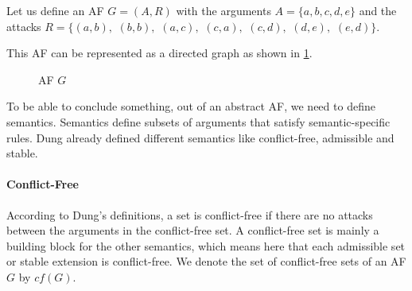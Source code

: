 \begin{example}
    Let us define an AF $G = (A, R)$ with the arguments
    $A=\{a, b, c, d, e\}$ and the attacks
    $R=\bigl\{(a,b),$
    $(b,b),$
    $(a,c),$
    $(c,a),$
    $(c,d),$
    $(d,e),$
    $(e,d)\bigl\}.$

    This AF can be represented as a directed graph as shown in \cref{af:backgroundAFexample1}.
    \begin{figure}[h]
        \centering
        \caption{AF $G$}
        \label{af:backgroundAFexample1}
    \end{figure}
\end{example}

To be able to conclude something, out of an abstract AF, we need to define semantics. Semantics define subsets of arguments that satisfy semantic-specific rules. Dung already defined different semantics \cite{Dung1995-DUNOTA-2} like conflict-free, admissible and stable.

\newpage
\paragraph{Conflict-Free} According to Dung's definitions, a set is conflict-free if there are no attacks between the arguments in the conflict-free set. A conflict-free set is mainly a building block for the other semantics, which means here that each admissible set or stable extension is conflict-free. We denote the set of conflict-free sets of an AF $G$ by $cf(G)$.

